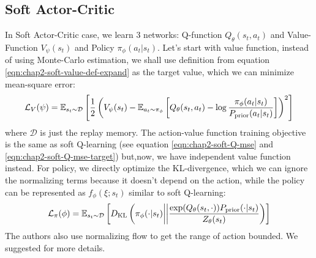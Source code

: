 \subsection{Soft Actor-Critic}
\label{sec:chap2-soft-ac-implement}

In Soft Actor-Critic case, we learn 3 networks: Q-function $Q_{\theta} (s_t, a_t)$ and Value-Function $V_{\psi}(s_t)$ and Policy $\pi_{\phi}(a_t | s_t)$. Let's start with value function, instead of using Monte-Carlo estimation, we shall use definition from equation \ref{eqn:chap2-soft-value-def-expand} as the target value, which we can minimize mean-square error:
\begin{equation}
    \mathcal{L}_V(\psi) = \mathbb{E}_{s_t \sim \mathcal{D}} \left[ \frac{1}{2} \left( V_{\psi}(s_t) - \mathbb{E}_{a_t \sim \pi_{\phi}}\left[ Q_{\theta}(s_t, a_t) - \log \frac{\pi_{\phi}(a_t | s_t)}{P_{\text{prior}}(a_t | s_t)} \right] \right)^2 \right]
\end{equation}
where $\mathcal{D}$ is just the replay memory. The action-value function training objective is the same as soft Q-learning (see equation \ref{eqn:chap2-soft-Q-mse} and \ref{eqn:chap2-soft-Q-mse-target}) but,now, we have independent value function instead. For policy, we directly optimize the KL-divergence, which we can ignore the normalizing terms because it doesn't depend on the action, while the policy can be represented as $f_\phi(\xi ; s_t)$ similar to soft Q-learning:
\begin{equation}
    \mathcal{L}_{\pi}(\phi) = \mathbb{E}_{s_t \sim \mathcal{D}} \left[ D_{\mathrm{KL}}\left( \pi_{\phi}(\cdot | s_t) \bigg| \bigg| \frac{\exp(Q_{\theta}(s_t, \cdot)) P_{\text{prior}}(\cdot | s_t)}{Z_{\theta}(s_t)} \right) \right]
\end{equation}
The authors also use normalizing flow to get the range of action bounded. We suggested \cite{haarnoja2018softa} for more details.